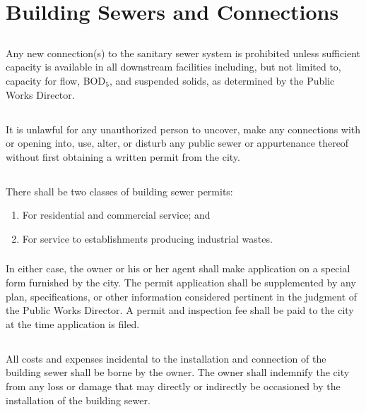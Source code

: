 \setcounter{section}{14}
\section{Building Sewers and Connections}
\subsection{}
Any new connection(s) to the sanitary sewer system is prohibited unless sufficient capacity is available in all downstream facilities including, but not limited to, capacity for flow, BOD$_{5}$, and suspended solids, as determined by the Public Works Director.
\subsection{}
It is unlawful for any unauthorized person to uncover, make any connections with or opening into, use, alter, or disturb any public sewer or appurtenance thereof without first obtaining a written permit from the city.
\subsection{}
\subsubsection{}
There shall be two classes of building sewer permits:
\begin{enumerate}[{\indent}a)]
    \item For residential and commercial service; and
    \item For service to establishments producing industrial wastes.
\end{enumerate}
\subsubsection{}
In either case, the owner or his or her agent shall make application on a special form furnished by the city.  The permit application shall be supplemented by any plan, specifications, or other information considered pertinent in the judgment of the Public Works Director.  A permit and inspection fee shall be paid to the city at the time application is filed.
\subsection{}
All costs and expenses incidental to the installation and connection of the building sewer shall be borne by the owner.  The owner shall indemnify the city from any loss or damage that may directly or indirectly be occasioned by the installation of the building sewer.
